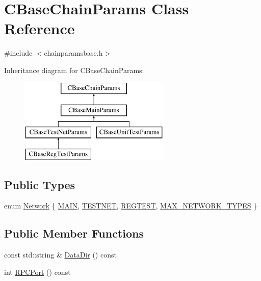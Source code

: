 \hypertarget{class_c_base_chain_params}{}\section{C\+Base\+Chain\+Params Class Reference}
\label{class_c_base_chain_params}


{\ttfamily \#include $<$chainparamsbase.\+h$>$}

Inheritance diagram for C\+Base\+Chain\+Params\+:\begin{figure}[H]
\begin{center}
\leavevmode
\includegraphics[height=4.000000cm]{class_c_base_chain_params}
\end{center}
\end{figure}
\subsection*{Public Types}
\begin{DoxyCompactItemize}
\item 
enum \hyperlink{class_c_base_chain_params_a19fb46b499c21801c0ff3c8607a0994e}{Network} \{ \hyperlink{class_c_base_chain_params_a19fb46b499c21801c0ff3c8607a0994ea17aedaa2a3181d12f0d32afc70a6c68c}{M\+A\+I\+N}, 
\hyperlink{class_c_base_chain_params_a19fb46b499c21801c0ff3c8607a0994ea0a9c4e42da932cdd126777f7f4dd0e22}{T\+E\+S\+T\+N\+E\+T}, 
\hyperlink{class_c_base_chain_params_a19fb46b499c21801c0ff3c8607a0994eace36282edb786b098dbdd48f98ddb793}{R\+E\+G\+T\+E\+S\+T}, 
\hyperlink{class_c_base_chain_params_a19fb46b499c21801c0ff3c8607a0994eaf4a96679adc48f01c489d1b4d740deb5}{M\+A\+X\+\_\+\+N\+E\+T\+W\+O\+R\+K\+\_\+\+T\+Y\+P\+E\+S}
 \}
\end{DoxyCompactItemize}
\subsection*{Public Member Functions}
\begin{DoxyCompactItemize}
\item 
const std\+::string \& \hyperlink{class_c_base_chain_params_af56a637b20c9f496108bffc3166ea53a}{Data\+Dir} () const 
\item 
int \hyperlink{class_c_base_chain_params_a06d2e58bdb42bb54932daf9a7a11182f}{R\+P\+C\+Port} () const 
\end{DoxyCompactItemize}
